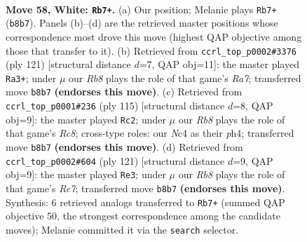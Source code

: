 \documentclass[11pt]{article}
\begin{document}
\clearpage

\begin{figure}[p]\centering
\begin{subfigure}{0.46\textwidth}\centering
\resizebox{\linewidth}{!}{%
\newchessgame
\chessboard[
  setfen={1R6/5kp1/5p2/7p/2NP3P/6P1/7K/r7 w - - 9 58},
  showmover=false,
  pgfstyle=straightmove, color=movearrow, markmove={b8-b7}
]}
\caption{}
\end{subfigure}\hfill
\begin{subfigure}{0.46\textwidth}\centering
\resizebox{\linewidth}{!}{%
\newchessgame
\chessboard[
  setfen={1R6/4kp2/6p1/6P1/4PP2/5K2/r7/8 b - - 2 61},
  showmover=false,
  pgfstyle=straightmove, color=movearrow, markmove={a2-a3}
]}
\caption{}
\end{subfigure}
\\[4pt]
\begin{subfigure}{0.46\textwidth}\centering
\resizebox{\linewidth}{!}{%
\newchessgame
\chessboard[
  setfen={1R6/5k2/6p1/4p2p/4P2P/5P2/6PK/2r5 b - - 36 58},
  showmover=false,
  pgfstyle=straightmove, color=movearrow, markmove={c1-c2}
]}
\caption{}
\end{subfigure}\hfill
\begin{subfigure}{0.46\textwidth}\centering
\resizebox{\linewidth}{!}{%
\newchessgame
\chessboard[
  setfen={8/6pk/5p2/7p/7P/6PK/4r3/R7 b - - 31 61},
  showmover=false,
  pgfstyle=straightmove, color=movearrow, markmove={e2-e3}
]}
\caption{}
\end{subfigure}
\caption{\textbf{Move 58, White: \texttt{Rb7+}.} (a) Our position; Melanie plays \texttt{Rb7+} (\texttt{b8b7}). Panels (b)--(d) are the retrieved master positions whose correspondence most drove this move (highest QAP objective among those that transfer to it). (b) Retrieved from \texttt{ccrl\_top\_p0002\#3376} (ply 121) [structural distance $d$=7, QAP obj=11]: the master played \texttt{Ra3+}; under $\mu$ our \emph{Rb8} plays the role of that game's \emph{Ra7}; transferred move \texttt{b8b7} \textbf{(endorses this move)}. (c) Retrieved from \texttt{ccrl\_top\_p0001\#236} (ply 115) [structural distance $d$=8, QAP obj=9]: the master played \texttt{Rc2}; under $\mu$ our \emph{Rb8} plays the role of that game's \emph{Rc8}; cross-type roles: our \emph{N}c4 as their \emph{p}h4; transferred move \texttt{b8b7} \textbf{(endorses this move)}. (d) Retrieved from \texttt{ccrl\_top\_p0002\#604} (ply 121) [structural distance $d$=9, QAP obj=9]: the master played \texttt{Re3}; under $\mu$ our \emph{Rb8} plays the role of that game's \emph{Re7}; transferred move \texttt{b8b7} \textbf{(endorses this move)}. Synthesis: 6 retrieved analogs transferred to \texttt{Rb7+} (summed QAP objective 50, the strongest correspondence among the candidate moves); Melanie committed it via the \texttt{search} selector.}
\label{fig:thought-m114}
\end{figure}
\end{document}
